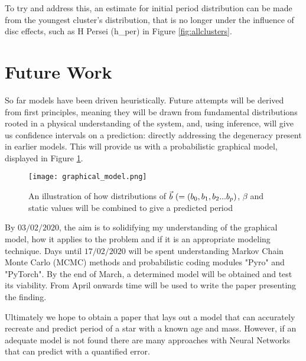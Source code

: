 \documentclass[fleqn,usenatbib]{mnras}
\begin{document}
{To try and address this, an estimate for initial period distribution can be made from the youngest cluster's distribution, that is no longer under the influence of disc effects, such as H Persei (h\_per) in Figure \ref{fig:allclusters}.

\section{Future Work}
So far models have been driven heuristically.
Future attempts will be derived from first principles, meaning they will be drawn from fundamental distributions rooted in a physical understanding of the system, and, using inference, will give us confidence intervals on a prediction: directly addressing the degeneracy present in earlier models.
This will provide us with a probabilistic graphical model, displayed in Figure \ref{fig:graphical_model}.

\begin{figure}
	\texttt{[image: graphical\_model.png]}
	\caption{An illustration of how distributions of $\protect\vec{b}~(= (b_0, b_1, b_2...b_p)$, $\beta$ and static values will be combined to give a predicted period}
	\label{fig:graphical_model}
\end{figure}

By $03/02/2020$, the aim is to solidifying my understanding of the graphical model, how it applies to the problem and if it is an appropriate modeling technique.
Days until $17/02/2020$ will be spent understanding Markov Chain Monte Carlo (MCMC) methods and probabilistic coding modules "Pyro" and "PyTorch".
By the end of March, a determined model will be obtained and test its viability.
From April onwards time will be used to write the paper presenting the finding.

Ultimately we hope to obtain a paper that lays out a model that can accurately recreate and predict period of a star with a known age and mass.
However, if an adequate model is not found there are many approaches with Neural Networks that can predict with a quantified error.

 
}
\end{document}
